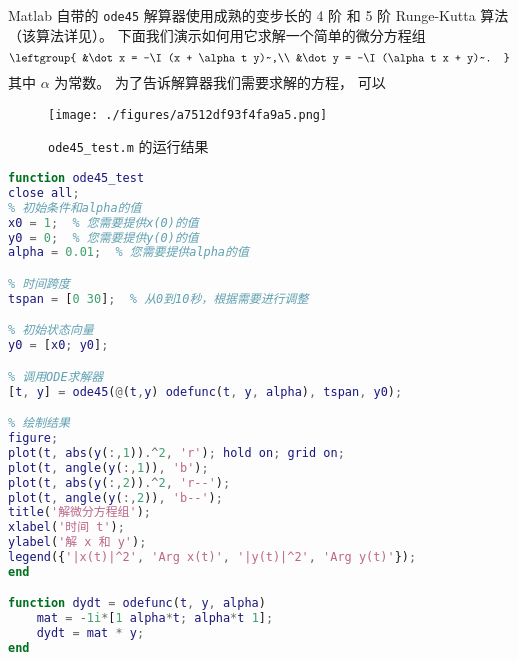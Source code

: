 
Matlab 自带的 \verb`ode45` 解算器使用成熟的变步长的 4 阶 和 5 阶 Runge-Kutta 算法（该算法详见）。 下面我们演示如何用它求解一个简单的微分方程组
\begin{equation}
\leftgroup{
&\dot x = -\I (x + \alpha t y)~,\\
&\dot y = -\I (\alpha t x + y)~.
}\end{equation}
其中 $\alpha$ 为常数。 为了告诉解算器我们需要求解的方程， 可以

\begin{figure}[ht]
\centering
\texttt{[image: ./figures/a7512df93f4fa9a5.png]}
\caption{\verb|ode45_test.m| 的运行结果} \label{fig_MatODE_2}
\end{figure}

\begin{lstlisting}[language=matlab,caption=ode45\_test.m]
function ode45_test
close all;
% 初始条件和alpha的值
x0 = 1;  % 您需要提供x(0)的值
y0 = 0;  % 您需要提供y(0)的值
alpha = 0.01;  % 您需要提供alpha的值

% 时间跨度
tspan = [0 30];  % 从0到10秒，根据需要进行调整

% 初始状态向量
y0 = [x0; y0];

% 调用ODE求解器
[t, y] = ode45(@(t,y) odefunc(t, y, alpha), tspan, y0);

% 绘制结果
figure;
plot(t, abs(y(:,1)).^2, 'r'); hold on; grid on;
plot(t, angle(y(:,1)), 'b');
plot(t, abs(y(:,2)).^2, 'r--');
plot(t, angle(y(:,2)), 'b--');
title('解微分方程组');
xlabel('时间 t');
ylabel('解 x 和 y');
legend({'|x(t)|^2', 'Arg x(t)', '|y(t)|^2', 'Arg y(t)'});
end

function dydt = odefunc(t, y, alpha)
    mat = -1i*[1 alpha*t; alpha*t 1];
    dydt = mat * y;
end
\end{lstlisting}

